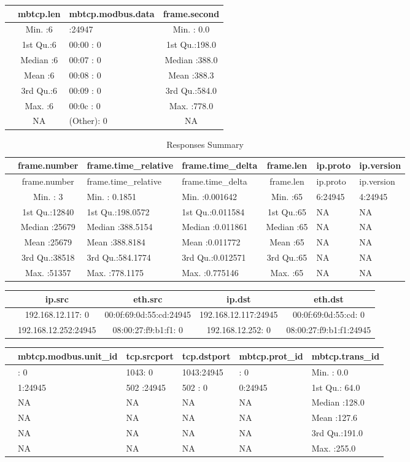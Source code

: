 \documentclass[11pt,]{article}
\begin{document}
\begin{longtable}[c]{@{}lclc@{}}
\toprule
& mbtcp.len & mbtcp.modbus.data & frame.second\tabularnewline
\midrule
\endhead
& Min. :6 & :24947 & Min. : 0.0\tabularnewline
& 1st Qu.:6 & 00:00 : 0 & 1st Qu.:198.0\tabularnewline
& Median :6 & 00:07 : 0 & Median :388.0\tabularnewline
& Mean :6 & 00:08 : 0 & Mean :388.3\tabularnewline
& 3rd Qu.:6 & 00:09 : 0 & 3rd Qu.:584.0\tabularnewline
& Max. :6 & 00:0c : 0 & Max. :778.0\tabularnewline
& NA & (Other): 0 & NA\tabularnewline
\bottomrule
\end{longtable}

\newpage

\begin{longtable}[c]{@{}lcllcll@{}}
\caption{Responses Summary}\tabularnewline
\toprule
& frame.number & frame.time\_relative & frame.time\_delta & frame.len &
ip.proto & ip.version\tabularnewline
\midrule
\endfirsthead
\toprule
& frame.number & frame.time\_relative & frame.time\_delta & frame.len &
ip.proto & ip.version\tabularnewline
\midrule
\endhead
& Min. : 3 & Min. : 0.1851 & Min. :0.001642 & Min. :65 & 6:24945 &
4:24945\tabularnewline
& 1st Qu.:12840 & 1st Qu.:198.0572 & 1st Qu.:0.011584 & 1st Qu.:65 & NA
& NA\tabularnewline
& Median :25679 & Median :388.5154 & Median :0.011861 & Median :65 & NA
& NA\tabularnewline
& Mean :25679 & Mean :388.8184 & Mean :0.011772 & Mean :65 & NA &
NA\tabularnewline
& 3rd Qu.:38518 & 3rd Qu.:584.1774 & 3rd Qu.:0.012571 & 3rd Qu.:65 & NA
& NA\tabularnewline
& Max. :51357 & Max. :778.1175 & Max. :0.775146 & Max. :65 & NA &
NA\tabularnewline
\bottomrule
\end{longtable}

\begin{longtable}[c]{@{}lcccc@{}}
\toprule
& ip.src & eth.src & ip.dst & eth.dst\tabularnewline
\midrule
\endhead
& 192.168.12.117: 0 & 00:0f:69:0d:55:cd:24945 & 192.168.12.117:24945 &
00:0f:69:0d:55:cd: 0\tabularnewline
& 192.168.12.252:24945 & 08:00:27:f9:b1:f1: 0 & 192.168.12.252: 0 &
08:00:27:f9:b1:f1:24945\tabularnewline
\bottomrule
\end{longtable}

\begin{longtable}[c]{@{}llllll@{}}
\toprule
& mbtcp.modbus.unit\_id & tcp.srcport & tcp.dstport & mbtcp.prot\_id &
mbtcp.trans\_id\tabularnewline
\midrule
\endhead
& : 0 & 1043: 0 & 1043:24945 & : 0 & Min. : 0.0\tabularnewline
& 1:24945 & 502 :24945 & 502 : 0 & 0:24945 & 1st Qu.:
64.0\tabularnewline
& NA & NA & NA & NA & Median :128.0\tabularnewline
& NA & NA & NA & NA & Mean :127.6\tabularnewline
& NA & NA & NA & NA & 3rd Qu.:191.0\tabularnewline
& NA & NA & NA & NA & Max. :255.0\tabularnewline
\bottomrule
\end{longtable}
\end{document}
